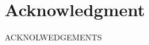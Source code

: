 \documentclass[conference]{IEEEtran}
\begin{document}


\section*{Acknowledgment}
ACKNOLWEDGEMENTS







%


\end{document}
